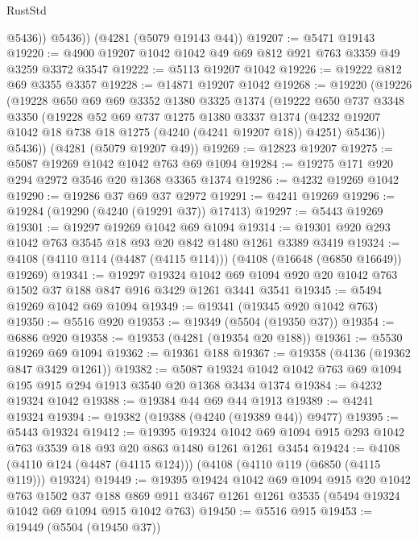 \begin{lexlean}{RustStd}
\begin{coremodule}
            @5436))
        @5436))
    (@4281 (@5079 @19143 @44))
@19207 := @5471 @19143
@19220 := @4900 @19207 @1042 @1042 @49 @69 @812 @921 @763 @3359 @49 @3259 @3372 @3547
@19222 := @5113 @19207 @1042
@19226 := @19222 @812 @69 @3355 @3357
@19228 := @14871 @19207 @1042
@19268 := @19220
    (@19226
      (@19228
        @650
        @69
        @69
        @3352
        @1380
        @3325
        @1374
        (@19222
          @650
          @737
          @3348
          @3350
          (@19228
            @52
            @69
            @737
            @1275
            @1380
            @3337
            @1374
            (@4232 @19207 @1042 @18 @738 @18 @1275 (@4240 (@4241 @19207 @18)) @4251)
            @5436))
        @5436))
    (@4281 (@5079 @19207 @49))
@19269 := @12823 @19207
@19275 := @5087 @19269 @1042 @1042 @763 @69 @1094
@19284 := @19275 @171 @920 @294 @2972 @3546 @20 @1368 @3365 @1374
@19286 := @4232 @19269 @1042
@19290 := @19286 @37 @69 @37 @2972
@19291 := @4241 @19269
@19296 := @19284 (@19290 (@4240 (@19291 @37)) @17413)
@19297 := @5443 @19269
@19301 := @19297 @19269 @1042 @69 @1094
@19314 := @19301 @920 @293 @1042 @763 @3545 @18 @93 @20 @842 @1480 @1261 @3389 @3419
@19324 := @4108 (@4110 @114 (@4487 (@4115 @114))) (@4108 (@16648 (@6850 @16649)) @19269)
@19341 := @19297
    @19324
    @1042
    @69
    @1094
    @920
    @20
    @1042
    @763
    @1502
    @37
    @188
    @847
    @916
    @3429
    @1261
    @3441
    @3541
@19345 := @5494 @19269 @1042 @69 @1094
@19349 := @19341 (@19345 @920 @1042 @763)
@19350 := @5516 @920
@19353 := @19349 (@5504 (@19350 @37))
@19354 := @6886 @920
@19358 := @19353 (@4281 (@19354 @20 @188))
@19361 := @5530 @19269 @69 @1094
@19362 := @19361 @188
@19367 := @19358 (@4136 (@19362 @847 @3429 @1261))
@19382 := @5087 @19324 @1042 @1042 @763 @69 @1094 @195 @915 @294 @1913 @3540 @20 @1368 @3434 @1374
@19384 := @4232 @19324 @1042
@19388 := @19384 @44 @69 @44 @1913
@19389 := @4241 @19324
@19394 := @19382 (@19388 (@4240 (@19389 @44)) @9477)
@19395 := @5443 @19324
@19412 := @19395
    @19324
    @1042
    @69
    @1094
    @915
    @293
    @1042
    @763
    @3539
    @18
    @93
    @20
    @863
    @1480
    @1261
    @1261
    @3454
@19424 := @4108 (@4110 @124 (@4487 (@4115 @124))) (@4108 (@4110 @119 (@6850 (@4115 @119))) @19324)
@19449 := @19395
    @19424
    @1042
    @69
    @1094
    @915
    @20
    @1042
    @763
    @1502
    @37
    @188
    @869
    @911
    @3467
    @1261
    @1261
    @3535
    (@5494 @19324 @1042 @69 @1094 @915 @1042 @763)
@19450 := @5516 @915
@19453 := @19449 (@5504 (@19450 @37))

\end{coremodule}
\end{lexlean}
